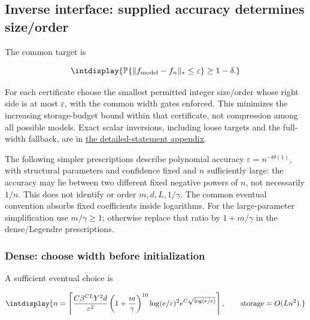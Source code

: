 \subsection{Inverse interface: supplied accuracy determines size/order}



The common target is


\begingroup\renewcommand{\theHequation}{intdisplay.16}
\begin{equation}
\intdisplay{
\mathbb P\{\|f_{\rm model}-f_n\|_*\le\varepsilon\}\ge1-\delta.
}
\label{int:eq-0013-target}
\end{equation}
\endgroup


For each certificate choose the smallest permitted integer size/order whose right side is at most \(\varepsilon\), with the common width gates enforced. This minimizes the increasing storage-budget bound within that certificate, not compression among all possible models. Exact scalar inversions, including loose targets and the full-width fallback, are in \hyperref[int:detailed-statements]{the detailed-statement appendix}.



The following simpler prescriptions describe polynomial accuracy \(\varepsilon=n^{-\Theta(1)}\), with structural parameters and confidence fixed and \(n\) sufficiently large: the accuracy may lie between two different fixed negative powers of \(n\), not necessarily \(1/n\). This does not identify or order \(m,\allowbreak d,\allowbreak L,\allowbreak 1/\gamma\). The common eventual convention absorbs fixed coefficients inside logarithms. For the large-parameter simplification use \(m/\gamma\ge1\); otherwise replace that ratio by \(1+m/\gamma\) in the dense/Legendre prescriptions.


\subsubsection{Dense: choose width before initialization}



A sufficient eventual choice is


\begingroup\renewcommand{\theHequation}{intdisplay.17}
\begin{equation}
\intdisplay{
n=\left\lceil
\frac{C\beta^{CL}Y^2d}{\varepsilon^2}
\left(1+\frac m\gamma\right)^{10}
\log(e/\varepsilon)^2
e^{C\sqrt{\log(e/\varepsilon)}}\right\rceil,
\qquad \text{storage}=O(Ln^2).
}
\label{int:eq-0014-dense-inverse}
\end{equation}
\endgroup

